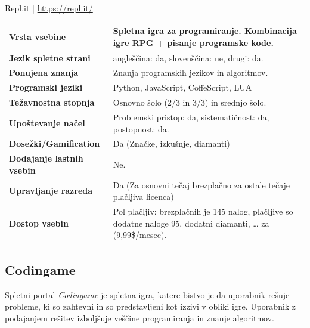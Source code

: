 \begin{osebnabox}[label={osebna:replIT}]{Repl.it | \url{https://repl.it/}}
    \begin{tabular}{
  p{} |
  p{}  }
  \textbf{Vrsta vsebine} & Spletna igra za programiranje. Kombinacija
                           igre RPG + pisanje programske kode. \\
      \hline
  \textbf{Jezik spletne strani} & angleščina: da, slovenščina: ne,
                                  drugi: da. \\
      \hline
  \textbf{Ponujena znanja} & Znanja programskih jezikov in  algoritmov. \\
      \hline
 \textbf{Programski jeziki} & Python, JavaScript, CoffeScript, LUA \\  
      \hline
  \textbf{Težavnostna stopnja} & Osnovno šolo (2/3 in 3/3) in srednjo
                                 šolo. \\ 
      \hline
   \textbf{Upoštevanje načel} & Problemski pristop: da,
                                sistematičnost: da, postopnost: da. \\
      \hline
  \textbf{Dosežki/Gamification} & Da (Značke, izkušnje, diamanti) \\
      \hline
  \textbf{Dodajanje lastnih vsebin} & Ne. \\
      \hline
  \textbf{Upravljanje razreda} & Da (Za osnovni tečaj brezplačno za
                                 ostale tečaje plačljiva licenca) \\ 
      \hline
  \textbf{Dostop vsebin} & Pol plačljiv: brezplačnih je 145 nalog,
                           plačljive so dodatne naloge 95, dodatni
                           diamanti, … za (9,99\$/mesec).   \\  

\end{tabular}
\end{osebnabox}

\subsection{Codingame}
\label{sec:codingame}

Spletni portal \emph{\href{https://www.codingame.com}{Codingame}}
\cite{web:codingame} je spletna igra, katere bistvo je da uporabnik
rešuje probleme, ki so zahtevni in so predstavljeni kot izzivi v
obliki igre. Uporabnik z podajanjem rešitev izboljšuje veščine
programiranja in znanje algoritmov.


